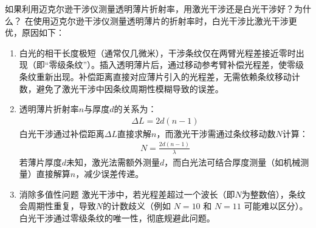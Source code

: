 \documentclass[dvipsnames, svgnames,a4paper,11pt]{article}
\begin{document}
\begin{question}
	如果利用迈克尔逊干涉仪测量透明薄片折射率，用激光干涉还是白光干涉好？为什么？
	\tcblower
	在使用迈克尔逊干涉仪测量透明薄片的折射率时，白光干涉比激光干涉更优，原因如下：
	\begin{enumerate}
		\item 白光的相干长度极短（通常仅几微米），干涉条纹仅在两臂光程差接近零时出现（即“零级条纹”）。插入透明薄片后，通过移动参考臂补偿光程差，使零级条纹重新出现。补偿距离直接对应薄片引入的光程差，无需依赖条纹移动计数，避免了激光干涉中因条纹周期性模糊导致的误差。
		\item 透明薄片折射率$n$与厚度$d$的关系为：
		\begin{align*}
			\Delta L=2d(n-1)
		\end{align*}
		白光干涉通过补偿距离$\Delta L$直接求解$n$，而激光干涉需通过条纹移动数$N$计算：
		\begin{align*}
			N=\frac{2d(n-1)}{\lambda}
		\end{align*}
		若薄片厚度$d$未知，激光法需额外测量$d$，而白光法可结合厚度测量（如机械测量）直接解算$n$，减少误差传递。
		\item 消除多值性问题
		激光干涉中，若光程差超过一个波长（即$N$为整数倍），条纹会周期性重复，导致$N$的计数歧义（例如 $N=10$ 和
		$N=11$ 可能难以区分）。白光干涉通过零级条纹的唯一性，彻底规避此问题。
	\end{enumerate}
\end{question}
\clearpage
%
%


\appendix
\appendixpage
\addappheadtotoc
%
\end{document}
